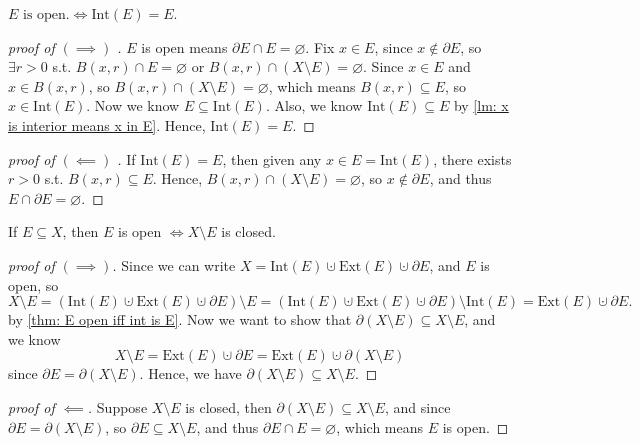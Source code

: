 \begin{theorem} \label{thm: E open iff int is E}
    \(E \text{ is open.} \iff \mathrm{Int}(E) = E \). 
\end{theorem}
\begin{proof}[proof of \((\implies )\) ]
    \(E\) is open means \(\partial E \cap E = \varnothing \). Fix \(x \in E\), since \(x \notin \partial E\), so \(\exists r > 0\) s.t. \(B(x,r) \cap E = \varnothing \) or \(B(x,r) \cap (X \setminus E) = \varnothing \). Since \(x \in E\) and \(x \in B(x,r)\), so \(B(x,r) \cap (X \setminus E) = \varnothing \), which means \(B(x,r) \subseteq E\), so \(x \in \mathrm{Int} (E)\). Now we know \(E \subseteq \mathrm{Int}(E) \). Also, we know \(\mathrm{Int}(E) \subseteq E \) by \autoref{lm: x is interior means x in E}. Hence, \(\mathrm{Int}(E) = E \).           
\end{proof}
\begin{proof}[proof of \((\impliedby )\) ]
    If \(\mathrm{Int}(E) = E \), then given any \(x \in E = \mathrm{Int}(E) \), there exists \(r>0\) s.t. \(B(x,r) \subseteq E\). Hence, \(B(x,r) \cap (X \setminus E) = \varnothing \), so \(x \notin \partial E\), and thus \(E \cap \partial E = \varnothing \).     
\end{proof}

\begin{theorem} \label{thm: E open iff X--E closed}
    If \(E \subseteq X\), then \(E\) is open \(\iff X \setminus E\) is closed.  
\end{theorem}
\begin{proof}[proof of \((\implies )\)]
    Since we can write \(X = \mathrm{Int}(E) \cupdot \mathrm{Ext}(E) \cupdot \partial E\), and \(E\) is open, so 
    \[
        X \setminus E = (\mathrm{Int}(E) \cupdot \mathrm{Ext}(E) \cupdot \partial E) \setminus E = (\mathrm{Int}(E) \cupdot \mathrm{Ext}(E) \cupdot \partial E) \setminus \mathrm{Int}(E) = \mathrm{Ext}(E) \cupdot \partial E.
    \] by \autoref{thm: E open iff int is E}. Now we want to show that \(\partial (X \setminus E) \subseteq X \setminus E\), and we know 
    \[
        X \setminus E = \mathrm{Ext}(E) \cupdot \partial E = \mathrm{Ext}(E) \cupdot \partial (X \setminus E)  
    \] since \(\partial E = \partial (X \setminus E)\). Hence, we have \(\partial (X \setminus E) \subseteq X\setminus E\).  
\end{proof}
\begin{proof}[proof of \(\impliedby \)]
    Suppose \(X \setminus E\) is closed, then \(\partial (X \setminus E) \subseteq X \setminus E\), and since \(\partial E = \partial (X \setminus E)\), so \(\partial E \subseteq X \setminus E\), and thus \(\partial E \cap E = \varnothing\), which means \(E\) is open.     
\end{proof}
